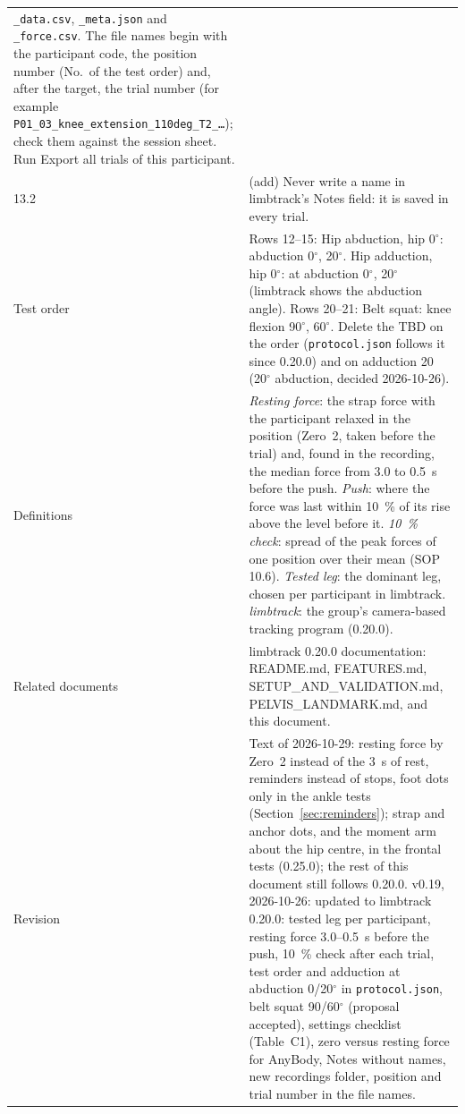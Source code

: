 \documentclass[a4paper,10pt]{article}
\newcommand{\lt}{\textsf{limbtrack}}
\newcommand{\ltversion}{0.20.0}
\newcommand{\code}[1]{\texttt{#1}}
\newcommand{\dg}{\ensuremath{^\circ}}
\begin{document}
\begin{longtable}{@{}P{2.2cm}p{14.3cm}@{}}
  \code{\_data.csv}, \code{\_meta.json} and \code{\_force.csv}. The file names begin with the participant code, the position number
  (No.\ of the test order) and, after the target, the trial number (for example \code{P01\_03\_knee\_extension\_110deg\_T2\_\dots}); check
  them against the session sheet. Run Export all trials of this participant. \\
13.2 & (add) Never write a name in \lt{}'s Notes field: it is saved in every trial. \\
Test order & Rows 12--15: Hip abduction, hip 0\dg: abduction 0\dg, 20\dg. Hip adduction, hip 0\dg: at abduction 0\dg, 20\dg{} (\lt{}
  shows the abduction angle). Rows 20--21: Belt squat: knee flexion 90\dg, 60\dg. Delete the TBD on the order (\code{protocol.json}
  follows it since 0.20.0) and on adduction 20 (20\dg{} abduction, decided 2026-10-26). \\
Definitions & \emph{Resting force}: the strap force with the participant relaxed in the position (Zero~2, taken before the trial) and, found in the
  recording, the median force from 3.0 to 0.5~s before the push.
  \emph{Push}: where the force was last within 10~\% of its rise above the level before it. \emph{10~\% check}: spread of the peak forces
  of one position over their mean (SOP 10.6). \emph{Tested leg}: the dominant leg, chosen per participant in \lt{}. \emph{limbtrack}: the
  group's camera-based tracking program (\ltversion). \\
Related documents & \lt{} \ltversion{} documentation: README.md, FEATURES.md, SETUP\_AND\_VALIDATION.md, PELVIS\_LANDMARK.md, and this
  document. \\
Revision & Text of 2026-10-29: resting force by Zero~2 instead of the 3~s of rest, reminders instead of stops, foot dots only in
  the ankle tests (Section~\ref{sec:reminders}); strap and anchor dots, and the moment arm about the hip centre, in the frontal tests
  (0.25.0); the rest of this document still follows 0.20.0. v0.19, 2026-10-26: updated to \lt{} \ltversion: tested leg per participant, resting force 3.0--0.5~s before the push, 10~\%
  check after each trial, test order and adduction at abduction 0/20\dg{} in \code{protocol.json}, belt squat 90/60\dg{} (proposal
  accepted), settings checklist (Table~C1), zero versus resting force for AnyBody, Notes without names, new recordings folder, position
  and trial number in the file names. \\
\bottomrule
\end{longtable}

\end{document}
